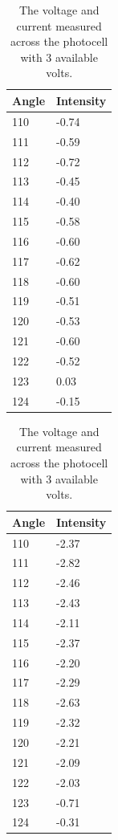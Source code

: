 \documentclass[a4paper]{article}
\begin{document}
\begin{table}[H]
  \caption{The voltage and current measured across the photocell with 3
    available volts.}
  \begin{center}
    \begin{tabular}{|l|l|}
      \hline
      Angle & Intensity \\
      \hline
      110 & -0.74 \\
      111 & -0.59 \\
      112 & -0.72 \\
      113 & -0.45 \\
      114 & -0.40 \\
      115 & -0.58 \\
      116 & -0.60 \\
      117 & -0.62 \\
      118 & -0.60 \\
      119 & -0.51 \\
      120 & -0.53 \\
      121 & -0.60 \\
      122 & -0.52 \\
      123 & 0.03 \\
      124 & -0.15 \\
      \hline
    \end{tabular}
  \end{center}
\end{table}

\begin{table}[H]
  \caption{The voltage and current measured across the photocell with 3
    available volts.}
  \begin{center}
    \begin{tabular}{|l|l|}
      \hline
      Angle & Intensity \\
      \hline
      110 & -2.37 \\
      111 & -2.82 \\
      112 & -2.46 \\
      113 & -2.43 \\
      114 & -2.11 \\
      115 & -2.37 \\
      116 & -2.20 \\
      117 & -2.29 \\
      118 & -2.63 \\
      119 & -2.32 \\
      120 & -2.21 \\
      121 & -2.09 \\
      122 & -2.03 \\
      123 & -0.71 \\
      124 & -0.31 \\
      \hline
    \end{tabular}
  \end{center}
\end{table}
\end{document}
